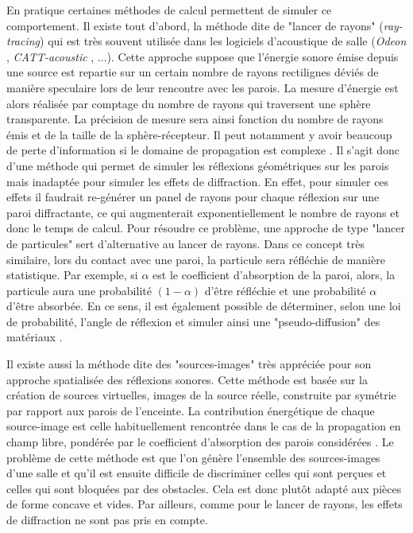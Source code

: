 En pratique certaines méthodes de calcul permettent de simuler ce comportement. Il existe tout d'abord, la méthode dite de "lancer de rayons" (\textit{ray-tracing})\cite[p.449-468]{raytracing} qui est très souvent utilisée dans les logiciels d'acoustique de salle (\textit{Odeon} \cite[page web]{odeon}, \textit{CATT-acoustic} \cite[page web]{catt}, ...). Cette approche suppose que l’énergie sonore émise depuis une source est repartie sur un certain nombre de rayons rectilignes déviés de manière \gls{speculaire} lors de leur rencontre avec les parois. La mesure d'énergie est alors réalisée par comptage du nombre de rayons qui traversent une sphère transparente. La précision de mesure sera ainsi fonction du nombre de rayons émis et de la taille de la sphère-récepteur. Il peut notamment y avoir beaucoup de perte d'information si le domaine de propagation est complexe \cite[p. 60]{picaut}. Il s'agit donc d'une méthode qui permet de simuler les réflexions géométriques sur les parois mais inadaptée pour simuler les effets de diffraction. En effet, pour simuler ces effets il faudrait re-générer un panel de rayons pour chaque réflexion sur une paroi diffractante, ce qui augmenterait exponentiellement le nombre de rayons et donc le temps de calcul. Pour résoudre ce problème, une approche de type "lancer de particules" sert d'alternative au lancer de rayons. Dans ce concept très similaire, lors du contact avec une paroi, la particule sera réfléchie de manière statistique. Par exemple, si $\alpha$ est le coefficient d'absorption de la paroi, alors, la particule aura une probabilité $(1-\alpha)$ d'être réfléchie et une probabilité $\alpha$ d'être absorbée. En ce sens, il est également possible de déterminer, selon une loi de probabilité, l'angle de réflexion et simuler ainsi une "pseudo-diffusion" des matériaux \cite[p. 62]{picaut}. %


Il existe aussi la méthode dite des "sources-images" \cite[p.6]{jouhaneau} très appréciée pour son approche spatialisée des réflexions sonores. Cette méthode est basée sur la création de sour\-ces virtuelles, images de la source réelle, construite par symétrie par rapport aux parois de l'enceinte. La contribution énergétique de chaque source-image est celle habituellement rencontrée dans le cas de la propagation en champ libre, pondérée par le coefficient d’absorption des parois considérées \cite[p. 60]{picaut}.
Le problème de cette méthode est que l'on génère l'ensemble des sources-images d'une salle et qu'il est ensuite difficile de discriminer celles qui sont perçues et celles qui sont bloquées par des obstacles. Cela est donc plutôt adapté aux pièces de forme concave et vides. Par ailleurs, comme pour le lancer de rayons, les effets de diffraction ne sont pas pris en compte. 


